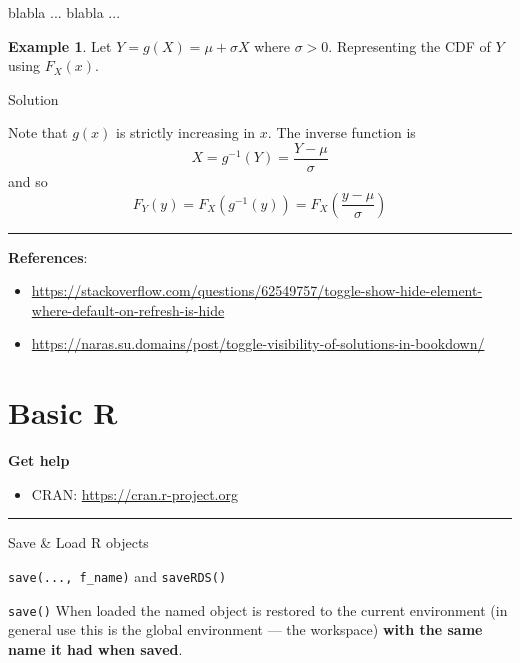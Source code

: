 \documentclass[
  a4paper,
  twoside,
  openright]{book}
\newenvironment{Shaded}{\begin{snugshade}}{\end{snugshade}}
\newcommand{\NormalTok}[1]{#1}
\providecommand{\tightlist}{%
  \setlength{\itemsep}{0pt}\setlength{\parskip}{0pt}}
\theoremstyle{definition}
\theoremstyle{definition}
\newtheorem{example}{Example}[chapter]
\theoremstyle{definition}
\theoremstyle{definition}
\theoremstyle{remark}
\begin{document}
\begin{Shaded}
\begin{Highlighting}[]
\NormalTok{blabla ...}
\NormalTok{blabla ...}
\end{Highlighting}
\end{Shaded}

\begin{example}
\protect\hypertarget{exm:ex1}{}\label{exm:ex1}Let \(Y=g(X)=\mu+\sigma X\) where \(\sigma>0\). Representing the CDF of \(Y\) using \(F_X(x)\).
\end{example}

Solution

\label{myDIV}
Note that \(g(x)\) is strictly increasing in \(x\).
The inverse function is
\[
X = g^{-1}(Y) = \frac{Y-\mu}{\sigma}
\]
and so
\[
F_Y(y) = F_X\left(g^{-1}(y)\right) = F_X\left(\frac{y-\mu}{\sigma}\right)
\]

\begin{center}\rule{0.5\linewidth}{0.5pt}\end{center}

\textbf{References}:

\begin{itemize}
\tightlist
\item
  \url{https://stackoverflow.com/questions/62549757/toggle-show-hide-element-where-default-on-refresh-is-hide}
\item
  \url{https://naras.su.domains/post/toggle-visibility-of-solutions-in-bookdown/}
\end{itemize}

\chapter{Basic R}\label{basic-r}

\textbf{Get help}

\begin{itemize}
\tightlist
\item
  CRAN: \url{https://cran.r-project.org}
\end{itemize}

\begin{center}\rule{0.5\linewidth}{0.5pt}\end{center}

Save \& Load R objects

\texttt{save(...,\ f\_name)} and \texttt{saveRDS()}

\texttt{save()} When loaded the named object is restored to the current environment (in general use this is the global environment --- the workspace) \textbf{with the same name it had when saved}.
\end{document}
